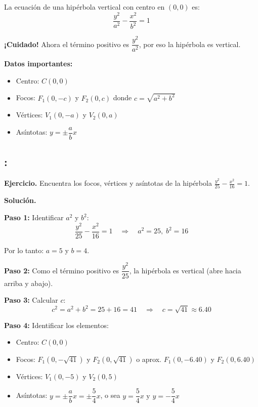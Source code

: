 \documentclass[12pt,a4paper]{article}
\begin{document}
	La ecuación de una hipérbola vertical con centro en $(0,0)$ es:
	\[
	\boxed{\frac{y^2}{a^2}-\frac{x^2}{b^2}=1}
	\]

	\textbf{¡Cuidado!} Ahora el término positivo es $\dfrac{y^2}{a^2}$, por eso la hipérbola es vertical.

	\textbf{Datos importantes:}
	\begin{itemize}
		\item Centro: $C(0,0)$
		\item Focos: $F_1(0,-c)$ y $F_2(0,c)$ donde $c=\sqrt{a^2+b^2}$
		\item Vértices: $V_1(0,-a)$ y $V_2(0,a)$
		\item Asíntotas: $y=\pm\dfrac{a}{b}x$
	\end{itemize}

	\subsection*{{\color{blue!40!red}{Ejemplo 2}}: \color{blue!80!black}{Hipérbola vertical con centro en el origen}}

	\textbf{Ejercicio.} Encuentra los focos, vértices y asíntotas de la hipérbola $\displaystyle\frac{y^2}{25}-\frac{x^2}{16}=1$.

	\bigskip

	\textbf{Solución.}

	\bigskip

	\textbf{Paso 1:} Identificar $a^2$ y $b^2$:
	\[
	\frac{y^2}{25}-\frac{x^2}{16}=1 \quad\Rightarrow\quad a^2=25,\;b^2=16
	\]

	Por lo tanto: $a=5$ y $b=4$.

	\textbf{Paso 2:} Como el término positivo es $\dfrac{y^2}{25}$, la hipérbola es vertical (abre hacia arriba y abajo).

	\textbf{Paso 3:} Calcular $c$:
	\[
	c^2=a^2+b^2=25+16=41 \quad\Rightarrow\quad c=\sqrt{41}\approx 6.40
	\]

	\textbf{Paso 4:} Identificar los elementos:
	\begin{itemize}
		\item Centro: $\boxed{C(0,0)}$
		\item Focos: $\boxed{F_1(0,-\sqrt{41})\text{ y }F_2(0,\sqrt{41})}$ o aprox. $F_1(0,-6.40)$ y $F_2(0,6.40)$
		\item Vértices: $\boxed{V_1(0,-5)\text{ y }V_2(0,5)}$
		\item Asíntotas: $y=\pm\dfrac{a}{b}x=\pm\dfrac{5}{4}x$, o sea $\boxed{y=\dfrac{5}{4}x\text{ y }y=-\dfrac{5}{4}x}$
	\end{itemize}
\end{document}
